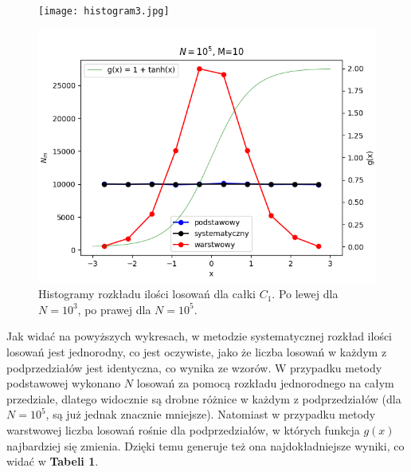 \documentclass[a4paper,12pt,twoside]{article}
\begin{document}
\newpage
\begin{figure}[h!]
\hspace{-10mm}
    \begin{minipage}{0.55\textwidth}
        \centering
        \texttt{[image: histogram3.jpg]}
    \end{minipage}
    \begin{minipage}{0.55\textwidth}
        \includegraphics[scale = 0.55]{histogram5.png}
    \end{minipage}
    \caption{Histogramy rozkładu ilości losowań dla całki $C_1$. Po lewej dla $N = 10^3$, po prawej dla $N = 10^5$.}
\end{figure}

Jak widać na powyższych wykresach, w metodzie systematycznej rozkład ilości losowań jest jednorodny, co jest oczywiste, jako że liczba losowań w każdym z podprzedziałów jest identyczna, co wynika ze wzorów. W przypadku metody podstawowej wykonano $N$ losowań za pomocą rozkładu jednorodnego na całym przedziale, dlatego widocznie są drobne różnice w każdym z podprzedziałów (dla $N=10^5$, są już jednak znacznie mniejsze). Natomiast w przypadku metody warstwowej liczba losowań rośnie dla podprzedziałów, w których funkcja $g(x)$ najbardziej się zmienia. Dzięki temu generuje też ona najdokładniejsze wyniki, co widać w \textbf{Tabeli 1}.
\end{document}
